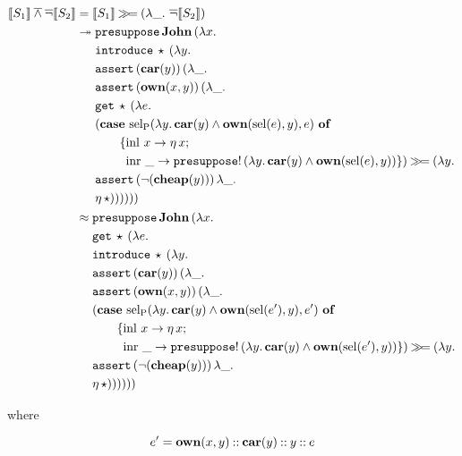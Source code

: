 
\begin{align*}
  \llbracket S_1 \rrbracket \mathbin{\overline{\land}} \mathop{\overline{\lnot}} \llbracket S_2 \rrbracket
  &= \llbracket S_1 \rrbracket \mathbin{\gg\!=} (\lambda \_.\, \mathop{\overline{\lnot}} \llbracket S_2 \rrbracket) \\
  &\twoheadrightarrow \begin{aligned}[t]
      &\mathtt{presuppose}\,\textbf{John}\,(\lambda x.\,  \\
      &\mathtt{introduce}\,\star\,(\lambda y.\,  \\
      &\mathtt{assert}\,(\textbf{car}(y))\,(\lambda \_.\,  \\
      &\mathtt{assert}\,(\textbf{own}(x, y))\,(\lambda \_.\,  \\
      &\mathtt{get}\,\star\,(\lambda e.\,  \\
      &(\text{\textbf{case} $\operatorname{sel_P}(\lambda y.\, \textbf{car}(y) \land \textbf{own}(\operatorname{sel}(e), y), e)$ \textbf{of}} \\ &\qquad \{\operatorname{inl}\,x \to \eta\,x; \\ &\qquad \ \operatorname{inr}\,\_ \to \mathtt{presuppose}!\,(\lambda y.\, \textbf{car}(y) \land \textbf{own}(\operatorname{sel}(e), y)) \}) \mathbin{\gg\!=} (\lambda y.\,  \\
      &\mathtt{assert}\,(\lnot (\textbf{cheap}(y)))\,\lambda \_.\,  \\
      &\eta\,\star))))))
    \end{aligned} \\
  &\approx \begin{aligned}[t]
      &\mathtt{presuppose}\,\textbf{John}\,(\lambda x.\,  \\
      &\mathtt{get}\,\star\,(\lambda e.\,  \\
      &\mathtt{introduce}\,\star\,(\lambda y.\,  \\
      &\mathtt{assert}\,(\textbf{car}(y))\,(\lambda \_.\,  \\
      &\mathtt{assert}\,(\textbf{own}(x, y))\,(\lambda \_.\,  \\
      &(\text{\textbf{case} $\operatorname{sel_P}(\lambda y.\, \textbf{car}(y) \land \textbf{own}(\operatorname{sel}(e'), y), e')$ \textbf{of}} \\ &\qquad \{\operatorname{inl}\,x \to \eta\,x; \\ &\qquad \ \operatorname{inr}\,\_ \to \mathtt{presuppose}!\,(\lambda y.\, \textbf{car}(y) \land \textbf{own}(\operatorname{sel}(e'), y)) \}) \mathbin{\gg\!=} (\lambda y.\,  \\
      &\mathtt{assert}\,(\lnot (\textbf{cheap}(y)))\,\lambda \_.\,  \\
      &\eta\,\star))))))
    \end{aligned}
\end{align*}

where

$$
e' = \textbf{own}(x, y) \mathbin{::} \textbf{car}(y) \mathbin{::} y \mathbin{::} e
$$

